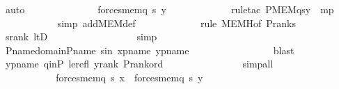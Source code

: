 \begin{isabellebody}
\ auto\ \isanewline
\ \ \ \ \ \ \ \ \isamarkupfalse%
\ \isamarkupfalse%
\ {\isachardoublequoteopen}{\isachardot}{\kern0pt}{\isachardot}{\kern0pt}{\isachardot}{\kern0pt}\ {\isasymlongleftrightarrow}\ forces{\isacharunderscore}{\kern0pt}mem{\isacharparenleft}{\kern0pt}q{\isacharcomma}{\kern0pt}\ s{\isacharcomma}{\kern0pt}\ y{\isacharparenright}{\kern0pt}{\isachardoublequoteclose}\ \isanewline
\ \ \ \ \ \ \ \ \ \ \isamarkupfalse%
\ {\isacharparenleft}{\kern0pt}rule{\isacharunderscore}{\kern0pt}tac\ P{\isacharequal}{\kern0pt}{\isachardoublequoteopen}MEM{\isacharparenleft}{\kern0pt}q{\isacharcomma}{\kern0pt}s{\isacharcomma}{\kern0pt}y{\isacharparenright}{\kern0pt}{\isachardoublequoteclose}\ \ mp{\isacharparenright}{\kern0pt}\ \isanewline
\ \ \ \ \ \ \ \ \ \ \isamarkupfalse%
\ {\isacharparenleft}{\kern0pt}simp\ add{\isacharcolon}{\kern0pt}MEM{\isacharunderscore}{\kern0pt}def{\isacharparenright}{\kern0pt}\ \isanewline
\ \ \ \ \ \ \ \ \ \ \isamarkupfalse%
\ {\isacharparenleft}{\kern0pt}rule\ MEMH{\isacharbrackleft}{\kern0pt}of\ {\isachardoublequoteopen}P{\isacharunderscore}{\kern0pt}rank{\isacharparenleft}{\kern0pt}s{\isacharparenright}{\kern0pt}{\isachardoublequoteclose}{\isacharbrackright}{\kern0pt}{\isacharparenright}{\kern0pt}\isanewline
\ \ \ \ \ \ \ \ \ \ \isamarkupfalse%
\ srank\ ltD\ \isanewline
\ \ \ \ \ \ \ \ \ \ \ \ \ \ \ \isamarkupfalse%
\ simp\ \isanewline
\ \ \ \ \ \ \ \ \ \ \isamarkupfalse%
\ P{\isacharunderscore}{\kern0pt}name{\isacharunderscore}{\kern0pt}domain{\isacharunderscore}{\kern0pt}P{\isacharunderscore}{\kern0pt}name{\isacharprime}{\kern0pt}\ sin\ xpname\ ypname\ \isanewline
\ \ \ \ \ \ \ \ \ \ \ \ \ \ \isamarkupfalse%
\ blast\ \isanewline
\ \ \ \ \ \ \ \ \ \ \isamarkupfalse%
\ ypname\ qinP\ le{\isacharunderscore}{\kern0pt}refl\ yrank\ P{\isacharunderscore}{\kern0pt}rank{\isacharunderscore}{\kern0pt}ord\ \isanewline
\ \ \ \ \ \ \ \ \ \ \ \ \ \isamarkupfalse%
\ simp{\isacharunderscore}{\kern0pt}all\ \isanewline
\ \ \ \ \ \ \ \ \ \ \isamarkupfalse%
\ \isanewline
\ \ \ \ \ \ \ \ \isamarkupfalse%
\ \isamarkupfalse%
\ {\isachardoublequoteopen}forces{\isacharunderscore}{\kern0pt}mem{\isacharparenleft}{\kern0pt}q{\isacharcomma}{\kern0pt}\ s{\isacharcomma}{\kern0pt}\ x{\isacharparenright}{\kern0pt}\ {\isasymlongleftrightarrow}\ forces{\isacharunderscore}{\kern0pt}mem{\isacharparenleft}{\kern0pt}q{\isacharcomma}{\kern0pt}\ s{\isacharcomma}{\kern0pt}\ y{\isacharparenright}{\kern0pt}\ {\isachardoublequoteclose}\ \isamarkupfalse%

\end{isabellebody}
